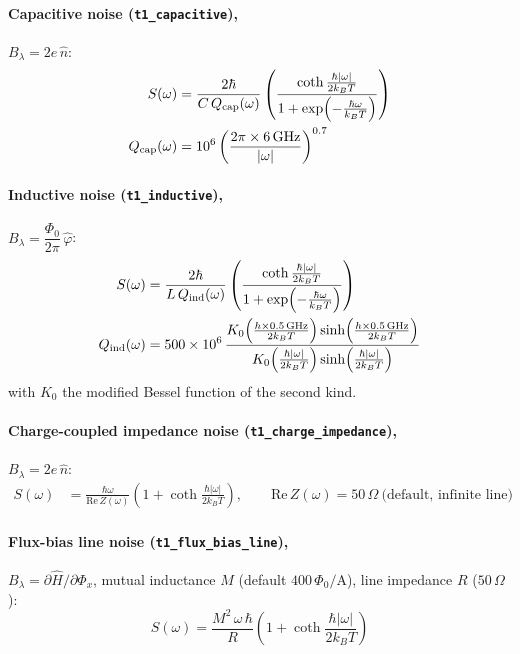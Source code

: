 \documentclass[11pt]{article}
\begin{document}
\paragraph{Capacitive noise (\texttt{t1\_capacitive}),} $B_\lambda = 2e\,\hat n$:
\begin{align}
  S(\omega) &= \frac{2\hbar}{C\,Q_{\rm cap}(\omega)}
    \left(\frac{\coth\frac{\hbar|\omega|}{2k_BT}}{1 + \exp\!\left(-\frac{\hbar\omega}{k_BT}\right)}\right) \\
  Q_{\rm cap}(\omega) &= 10^{6}\left(\frac{2\pi\times 6\,\text{GHz}}{|\omega|}\right)^{0.7}
\end{align}

\paragraph{Inductive noise (\texttt{t1\_inductive}),} $B_\lambda = \dfrac{\Phi_0}{2\pi}\,\hat\varphi$:
\begin{align}
  S(\omega) &= \frac{2\hbar}{L\,Q_{\rm ind}(\omega)}
    \left(\frac{\coth\frac{\hbar|\omega|}{2k_BT}}{1 + \exp\!\left(-\frac{\hbar\omega}{k_BT}\right)}\right) \\
  Q_{\rm ind}(\omega) &= 500\times 10^{6}\,
    \frac{K_0\!\left(\frac{h\times 0.5\,\text{GHz}}{2k_BT}\right)\sinh\!\left(\frac{h\times 0.5\,\text{GHz}}{2k_BT}\right)}
         {K_0\!\left(\frac{\hbar|\omega|}{2k_BT}\right)\sinh\!\left(\frac{\hbar|\omega|}{2k_BT}\right)}
\end{align}
with $K_0$ the modified Bessel function of the second kind.

\paragraph{Charge-coupled impedance noise (\texttt{t1\_charge\_impedance}),} $B_\lambda = 2e\,\hat n$:
\begin{align}
  S(\omega) &= \frac{\hbar\omega}{\mathrm{Re}\,Z(\omega)}\left(1 + \coth\frac{\hbar|\omega|}{2k_BT}\right),
  \qquad \mathrm{Re}\,Z(\omega) = 50\,\Omega\ \text{(default, infinite line)}
\end{align}

\paragraph{Flux-bias line noise (\texttt{t1\_flux\_bias\_line}),}
$B_\lambda = \partial\hat H/\partial\Phi_x$, mutual inductance $M$ (default $400\,\Phi_0/\text{A}$),
line impedance $R$ ($50\,\Omega$):
\begin{equation}
  S(\omega) = \frac{M^2\,\omega\,\hbar}{R}\left(1 + \coth\frac{\hbar|\omega|}{2k_BT}\right)
\end{equation}
\end{document}
